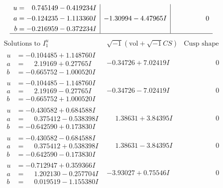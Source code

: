 \documentclass[1p]{elsarticle_modified}
\theoremstyle{definition}
\newcommand{\I}{\sqrt{-1}}
\begin{document}
$$\begin{array}{c|c|c}
\begin{aligned}
u &= \phantom{-}0.745149 - 0.419234 I \\
a &= -0.124235 - 1.113360 I \\
b &= -0.216959 - 0.372234 I\end{aligned}
 & -1.30994 - 4.47965 I & \phantom{-0.000000 } 0\\
 \hline 
 \end{array}$$\newpage$$\begin{array}{c|c|c}  
\text{Solutions to }I^u_{1}& \I (\text{vol} + \sqrt{-1}CS) & \text{Cusp shape}\\
 \hline 
\begin{aligned}
u &= -0.104485 + 1.148760 I \\
a &= \phantom{-}2.19169 + 0.27765 I \\
b &= -0.665752 - 1.000520 I\end{aligned}
 & -0.34726 + 7.02419 I & \phantom{-0.000000 } 0 \\ \hline\begin{aligned}
u &= -0.104485 - 1.148760 I \\
a &= \phantom{-}2.19169 - 0.27765 I \\
b &= -0.665752 + 1.000520 I\end{aligned}
 & -0.34726 - 7.02419 I & \phantom{-0.000000 } 0 \\ \hline\begin{aligned}
u &= -0.430582 + 0.684588 I \\
a &= \phantom{-}0.375412 - 0.538398 I \\
b &= -0.642590 + 0.173830 I\end{aligned}
 & \phantom{-}1.38631 + 3.84395 I & \phantom{-0.000000 } 0 \\ \hline\begin{aligned}
u &= -0.430582 - 0.684588 I \\
a &= \phantom{-}0.375412 + 0.538398 I \\
b &= -0.642590 - 0.173830 I\end{aligned}
 & \phantom{-}1.38631 - 3.84395 I & \phantom{-0.000000 } 0 \\ \hline\begin{aligned}
u &= -0.712947 + 0.359366 I \\
a &= \phantom{-}1.202130 - 0.257704 I \\
b &= \phantom{-}0.019519 - 1.155380 I\end{aligned}
 & -3.93027 + 0.75546 I & \phantom{-0.000000 } 0 \\ \hline\begin{aligned}

\end{aligned}
\end{array}$$
\end{document}

